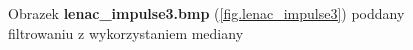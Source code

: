 \documentclass{classrep}
\begin{document}
\begin{figure}
{{  \label{fig.lenac_impulse3_median_5x5}
 }
}
\caption{Obrazek \textbf{lenac\_impulse3.bmp} (\ref{fig.lenac_impulse3}) poddany filtrowaniu z wykorzystaniem mediany}
\label{fig.lenac_impulse3_median}
\end{figure}
\end{document}
